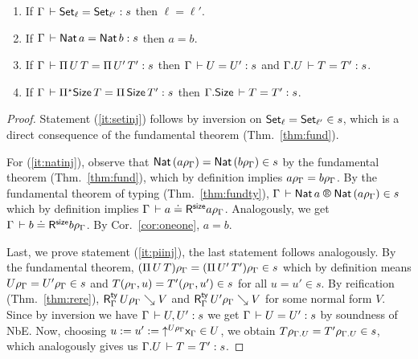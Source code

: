 \documentclass[acmlarge,review,anonymous]{acmart}\settopmatter{printfolios=true}
\begin{document}
\begin{corollary}
\label{cor:piinj}
\bla
\begin{enumerate}
\item \label{it:setinj}
  If $\Gamma \der \Set[\ell] = \Set[\ell'] : s$ then $\ell = \ell'$.
\item \label{it:natinj}
  If $\Gamma \der \Nat a = \Nat b : s$ then $a = b$.
\item \label{it:piinj}
  If $\Gamma \der \piT U T = \piT{U'}{T'} : s$ then
  $\Gamma \der U = U' : s$ and
  $\cext \Gamma U \der T = T' : s$.
\item \label{it:allinj}
  If $\Gamma \der \epiT \Size T = \piT{\Size}{T'} : s$ then
  $\cext \Gamma \Size \der T = T' : s$.
\end{enumerate}
\end{corollary}
\begin{proof}
\bla
Statement (\ref{it:setinj}) follows by inversion on  $\Set[\ell] = \Set[\ell'] \in s$, which is a direct consequence of the fundamental theorem (Thm.~\ref{thm:fund}).

For (\ref{it:natinj}), observe that $\Nat (a\rhog) = \Nat (b\rhog) \in s$
by the fundamental theorem (Thm.~\ref{thm:fund}), which by definition implies $a\rhog = b\rhog$. %
By the fundamental theorem of typing (Thm.~\ref{thm:fundty}), $\LRTS \Gamma {\Nat a} {\Nat (a\rhog)} s$
which by definition implies $\LRSize \Gamma a {a\rhog}$.  Analogously, we get $\LRSize \Gamma b {b\rhog}$.
By Cor.~\ref{cor:oneone}, $a = b$.


Last, we prove statement (\ref{it:piinj}), the last statement follows analogously.
By the fundamental theorem,
$(\piT U T)\rhog = (\piT{U'}{T'})\rhog \in s$ which by definition means
$U\rhog = U'\rhog \in s$ and $T(\rhog,u) = T'(\rhog,u') \in s$ for all $u = u' \in s$.
By reification (Thm.~\ref{thm:rere}),
$\RTy\Gamma {U\rhog} V$ and $\RTy\Gamma {U'\rhog} V$ for some normal form
$V$.
Since by inversion we have $\Gamma \der U,U' : s$ we get $\Gamma \der U = U' : s$ by soundness of NbE.
Now, choosing $u := u' := \up {U\rhog} \var\Gamma \in U$, we obtain
$T\rhogu = T' \rhogu \in s$, which analogously gives us $\cext\Gamma U \der T = T' : s$.
\end{proof}
\end{document}
